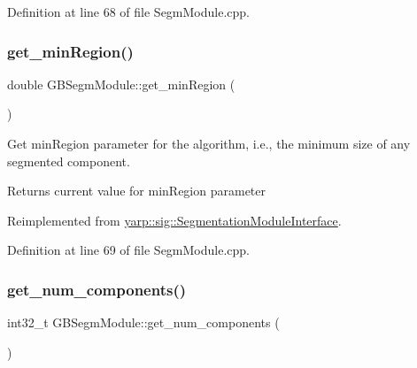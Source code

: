 Definition at line 68 of file Segm\+Module.\+cpp.


\begin{DoxyCode}{0}

\end{DoxyCode}
\mbox{\label{classGBSegmModule_a2378b95e60b406a119947aa86b5bb9c4}} 
\subsubsection{\texorpdfstring{get\_minRegion()}{get\_minRegion()}}
{\footnotesize\ttfamily double G\+B\+Segm\+Module\+::get\+\_\+min\+Region (\begin{DoxyParamCaption}{ }\end{DoxyParamCaption})\hspace{0.3cm}{\ttfamily [virtual]}}



Get min\+Region parameter for the algorithm, i.\+e., the minimum size of any segmented component. 

\begin{DoxyReturn}{Returns}
current value for min\+Region parameter 
\end{DoxyReturn}


Reimplemented from \mbox{\hyperlink{classyarp_1_1sig_1_1SegmentationModuleInterface_a6c184aeea894f6afcc342c5aa748429d}{yarp\+::sig\+::\+Segmentation\+Module\+Interface}}.



Definition at line 69 of file Segm\+Module.\+cpp.


\begin{DoxyCode}{0}

\end{DoxyCode}
\mbox{\label{classGBSegmModule_a655ee7c895eed07b07099133b9d8ce68}} 
\subsubsection{\texorpdfstring{get\_num\_components()}{get\_num\_components()}}
{\footnotesize\ttfamily int32\+\_\+t G\+B\+Segm\+Module\+::get\+\_\+num\+\_\+components (\begin{DoxyParamCaption}{ }\end{DoxyParamCaption})\hspace{0.3cm}{\ttfamily [virtual]}}



